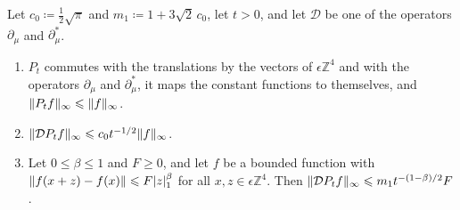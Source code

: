 \documentclass[11pt]{preprint}
\DeclarePairedDelimiter{\abs}{\lvert}{\rvert}
\DeclarePairedDelimiter{\norm}{\lVert}{\rVert}
\numberwithin{equation}{section}
\begin{document}
\begin{lemma}\label{lem:heat-kernel}
Let $c_0 \coloneqq \frac{1}{2}\sqrt\pi$ and $m_1 \coloneqq 1 + 3\sqrt 2\,c_0$, let $t > 0$, and let $\mathcal D$ be one of the operators $\partial_\mu$ and $\partial^*_\mu$.
\begin{enumerate}[label=(\roman*)]
\item $P_t$ commutes with the translations by the vectors of $\epsilon\mathbb Z^4$ and with the operators $\partial_\mu$ and $\partial^*_\mu$, it maps the constant functions to themselves, and $\norm{P_tf}_\infty \leqslant \norm f_\infty$.
\item $\norm{\mathcal DP_tf}_\infty \leqslant c_0t^{-1/2}\norm f_\infty$.
\item Let $0 \leqslant \beta \leqslant 1$ and $F \geqslant 0$, and let $f$ be a bounded function with $\norm{f(x + z) - f(x)} \leqslant F\abs z_1^\beta$ for all $x, z \in \epsilon\mathbb Z^4$. Then $\norm{\mathcal DP_tf}_\infty \leqslant m_1t^{-(1-\beta)/2}F$.
\end{enumerate}
\end{lemma}
\end{document}
